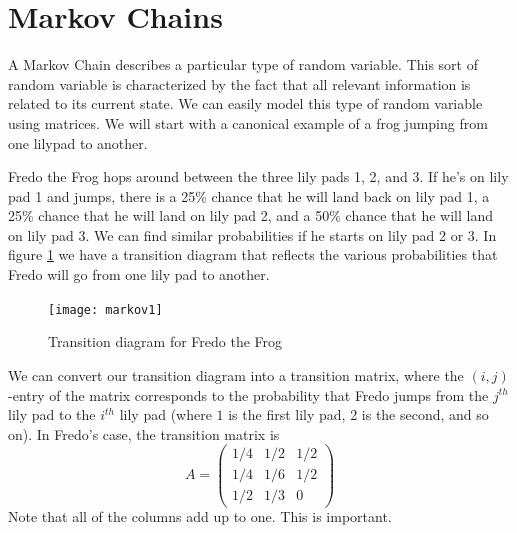 \label{Ch:Markov}


\section*{Markov Chains}


A Markov Chain describes a particular type of random variable.
This sort of random variable is characterized by the fact that all relevant information is related to its current state.
We can easily model this type of random variable using matrices.
We will start with a canonical example of a frog jumping from one lilypad to another.

Fredo the Frog hops around between the three lily pads 1, 2, and 3.
If he's on lily pad 1 and jumps, there is a 25\% chance that he will land back on lily pad 1, a 25\% chance that he will land on lily pad 2, and a 50\% chance that he will land on lily pad 3.
We can find similar probabilities if he starts on lily pad 2 or 3.
In figure \ref{markov1} we have a transition diagram that reflects the various probabilities that Fredo will go from one lily pad to another.

\begin{figure}[h!]
\begin{center}
\texttt{[image: markov1]}
\end{center}
\caption{Transition diagram for Fredo the Frog}
\label{markov1}
\end{figure}

We can convert our transition diagram into a transition matrix, where the $(i,j)$-entry of the matrix corresponds to the probability that Fredo jumps from the $j^{th}$ lily pad to the $i^{th}$ lily pad (where $1$ is the first lily pad, 2 is the second, and so on).
In Fredo's case, the transition matrix is
\[
A = \begin{pmatrix}
1/4 & 1/2 & 1/2\\
1/4 & 1/6 & 1/2\\
1/2 & 1/3 & 0
\end{pmatrix}
\]
Note that all of the columns add up to one.
This is important.

